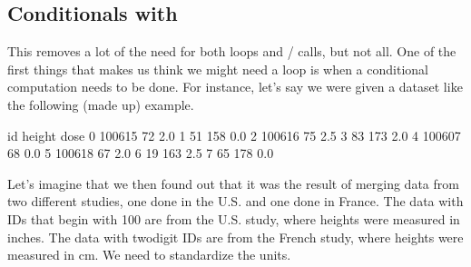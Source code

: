 \documentclass[letterpaper,10pt,english]{jupyterBook}
\begin{document}
\subsection{Conditionals with }
\label{\detokenize{chapter-11-processing-rows:conditionals-with-np-where}}
\sphinxAtStartPar
This removes a lot of the need for both loops and / calls, but not all.  One of the first things that makes us think we might need a loop is when a conditional computation needs to be done.  For instance, let’s say we were given a dataset like the following (made up) example.

\begin{sphinxVerbatim}[commandchars=\\\{\}]
   
      \PYG{p}{[}         \PYG{p}{]}
      \PYG{p}{[}         \PYG{p}{]}
      \PYG{p}{[}         \PYG{p}{]}
 
\end{sphinxVerbatim}

\begin{sphinxVerbatim}[commandchars=\\\{\}]
       id  height  dose
0  100615      72   2.0
1      51     158   0.0
2  100616      75   2.5
3      83     173   2.0
4  100607      68   0.0
5  100618      67   2.0
6      19     163   2.5
7      65     178   0.0
\end{sphinxVerbatim}

\sphinxAtStartPar
Let’s imagine that we then found out that it was the result of merging data from two different studies, one done in the U.S. and one done in France.  The data with IDs that begin with 100 are from the U.S. study, where heights were measured in inches.  The data with two\sphinxhyphen{}digit IDs are from the French study, where heights were measured in cm.  We need to standardize the units.
\end{document}
